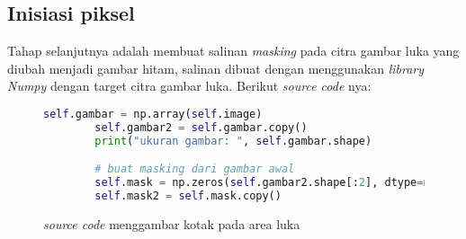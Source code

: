 \subsection{Inisiasi piksel}
Tahap selanjutnya adalah membuat salinan \emph{masking} pada citra gambar luka yang diubah
menjadi gambar hitam, salinan dibuat dengan menggunakan \emph{library} \emph{Numpy}
dengan target citra gambar luka. Berikut \emph{source code} nya:


\begin{figure}[H]
	\begin{lstlisting}[language=Python, basicstyle=\tiny]
			self.gambar = np.array(self.image)
        self.gambar2 = self.gambar.copy()
        print("ukuran gambar: ", self.gambar.shape)

        # buat masking dari gambar awal
        self.mask = np.zeros(self.gambar2.shape[:2], dtype=np.uint8)
        self.mask2 = self.mask.copy()
	\end{lstlisting}
	\caption{\emph{source code} menggambar kotak pada area luka}
	\label{img:mask_image}
\end{figure}




\begin{comment}

\end{comment}